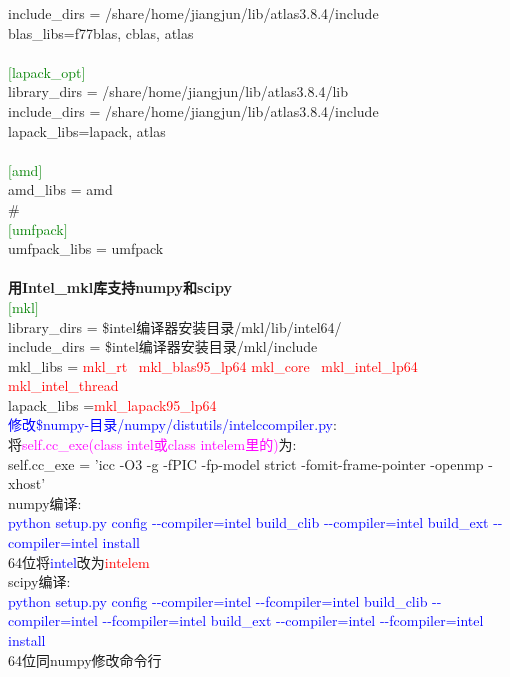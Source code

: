\documentclass[10pt,a4paper]{article}
\begin{document}
include\_dirs = /share/home/jiangjun/lib/atlas3.8.4/include \\
blas\_libs=f77blas, cblas, atlas \\
\\
\textcolor{green}{$[$lapack\_opt$]$}\\
library\_dirs = /share/home/jiangjun/lib/atlas3.8.4/lib \\
include\_dirs = /share/home/jiangjun/lib/atlas3.8.4/include \\
lapack\_libs=lapack, atlas \\
\\
\textcolor{green}{$[$amd$]$}\\
amd\_libs = amd \\
\#\\
\textcolor{green}{$[$umfpack$]$} \\
umfpack\_libs = umfpack \\
\\
\textbf{用Intel\_mkl库支持numpy和scipy}\\
\textcolor{green}{$[$mkl$]$}\\
library\_dirs = \$intel编译器安装目录/mkl/lib/intel64/ \\
include\_dirs = \$intel编译器安装目录/mkl/include \\
mkl\_libs = \textcolor{red}{mkl\_rt~ mkl\_blas95\_lp64 mkl\_core~ mkl\_intel\_lp64~ mkl\_intel\_thread}\\
lapack\_libs =\textcolor{red}{mkl\_lapack95\_lp64}\\

\textcolor{blue}{修改\$numpy-目录/numpy/distutils/intelccompiler.py}:\\
将\textcolor{magenta}{self.cc\_exe(class intel或class intelem里的)}为:\\
self.cc\_exe = 'icc -O3 -g -fPIC -fp-model strict -fomit-frame-pointer -openmp -xhost'\\
numpy编译:\\
\textcolor{blue}{python setup.py config -\/-compiler=intel build\_clib -\/-compiler=intel build\_ext -\/-compiler=intel install}\\
64位将\textcolor{blue}{intel}改为\textcolor{red}{intelem}\\
scipy编译:\\
\textcolor{blue}{python setup.py config -\/-compiler=intel -\/-fcompiler=intel build\_clib -\/-compiler=intel -\/-fcompiler=intel build\_ext -\/-compiler=intel -\/-fcompiler=intel install}\\
64位同numpy修改命令行\\
\end{document}

